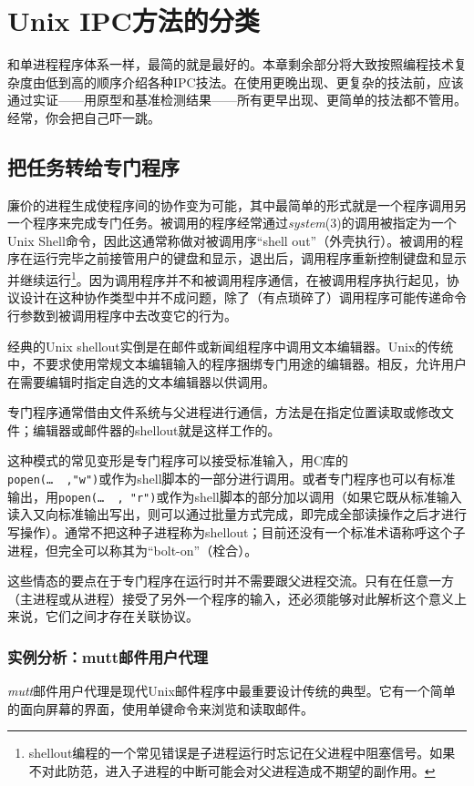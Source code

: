 \documentclass[12pt,oneside]{book}
\begin{document}
\section{Unix IPC方法的分类}
和单进程程序体系一样，最简的就是最好的。本章剩余部分将大致按照编程技术复杂度由低到高的顺序介绍各种IPC技法。在使用更晚出现、更复杂的技法前，应该通过实证——用原型和基准检测结果——所有更早出现、更简单的技法都不管用。经常，你会把自己吓一跳。

\subsection{把任务转给专门程序}
廉价的进程生成使程序间的协作变为可能，其中最简单的形式就是一个程序调用另一个程序来完成专门任务。被调用的程序经常通过\textit{system}(3)的调用被指定为一个Unix Shell命令，因此这通常称做对被调用序“shell out”（外壳执行）。被调用的程序在运行完毕之前接管用户的键盘和显示，退出后，调用程序重新控制键盘和显示并继续运行\footnote{shellout编程的一个常见错误是子进程运行时忘记在父进程中阻塞信号。如果不对此防范，进入子进程的中断可能会对父进程造成不期望的副作用。}。因为调用程序并不和被调用程序通信，在被调用程序执行起见，协议设计在这种协作类型中并不成问题，除了（有点琐碎了）调用程序可能传递命令行参数到被调用程序中去改变它的行为。

经典的Unix shellout实倒是在邮件或新闻组程序中调用文本编辑器。Unix的传统中，不要求使用常规文本编辑输入的程序捆绑专门用途的编辑器。相反，允许用户在需要编辑时指定自选的文本编辑器以供调用。

专门程序通常借由文件系统与父进程进行通信，方法是在指定位置读取或修改文件；编辑器或邮件器的shellout就是这样工作的。

这种模式的常见变形是专门程序可以接受标准输入，用C库的\\ \verb+popen(…  ,"w")+或作为shell脚本的一部分进行调用。或者专门程序也可以有标准输出，用\verb+popen(…  , "r")+或作为shell脚本的部分加以调用（如果它既从标准输入读入又向标准输出写出，则可以通过批量方式完成，即完成全部读操作之后才进行写操作）。通常不把这种子进程称为shellout；目前还没有一个标准术语称呼这个子进程，但完全可以称其为“bolt-on”（栓合）。

这些情态的要点在于专门程序在运行时并不需要跟父进程交流。只有在任意一方（主进程或从进程）接受了另外一个程序的输入，还必须能够对此解析这个意义上来说，它们之间才存在关联协议。

\subsubsection{实例分析：mutt邮件用户代理}
\textit{mutt}邮件用户代理是现代Unix邮件程序中最重要设计传统的典型。它有一个简单的面向屏幕的界面，使用单键命令来浏览和读取邮件。
\end{document}
